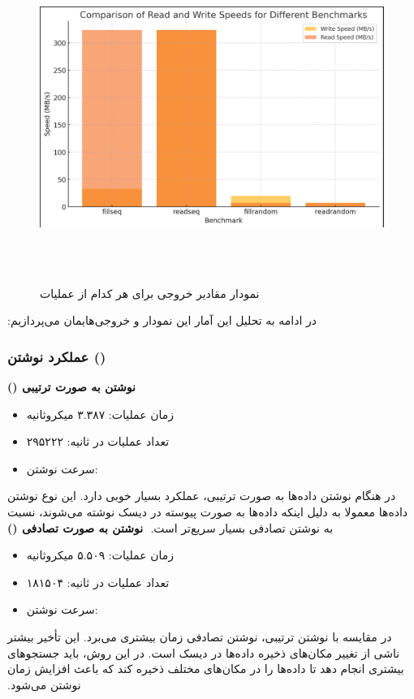 ‫
‫\begin{figure}[H]
‫    \centering
‫    \includegraphics[width=\textwidth]{figs/10.png}
‫    \caption{نمودار مقادیر خروجی برای هر کدام از عملیات}
‫\end{figure}
‫
‫در ادامه به تحلیل این آمار این نمودار و خروجی‌هایمان می‌پردازیم:
‫
‫\subsubsection*{عملکرد نوشتن ()}
‫
‫\textbf{نوشتن به صورت ترتیبی ()}
‫\begin{itemize}
‫    \item زمان عملیات: ۳.۳۸۷ میکروثانیه
‫    \item تعداد عملیات در ثانیه: ۲۹۵۲۲۲
‫    \item سرعت نوشتن: 
‫\end{itemize}
‫در هنگام نوشتن داده‌ها به صورت ترتیبی،  عملکرد بسیار خوبی دارد. این نوع نوشتن داده‌ها معمولا به دلیل اینکه داده‌ها به صورت پیوسته در دیسک نوشته می‌شوند، نسبت به نوشتن تصادفی بسیار سریع‌تر است.
‫
‫\textbf{نوشتن به صورت تصادفی ()}
‫\begin{itemize}
‫    \item زمان عملیات: ۵.۵۰۹ میکروثانیه
‫    \item تعداد عملیات در ثانیه: ۱۸۱۵۰۴
‫    \item سرعت نوشتن: 
‫\end{itemize}
‫در مقایسه با نوشتن ترتیبی، نوشتن تصادفی زمان بیشتری می‌برد. این تأخیر بیشتر ناشی از تغییر مکان‌های ذخیره داده‌ها در دیسک است. در این روش،  باید جستجوهای بیشتری انجام دهد تا داده‌ها را در مکان‌های مختلف ذخیره کند که باعث افزایش زمان نوشتن می‌شود.
